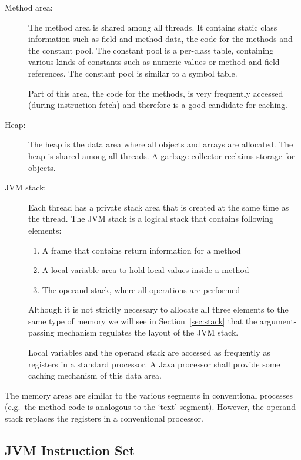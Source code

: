 \begin{description}
    \item[Method area:]
The method area is shared among all threads. It contains static
class information such as field and method data, the code for the
methods and the constant pool. The constant pool is a per-class
table, containing various kinds of constants such as numeric values
or method and field references. The constant pool is similar to a
symbol table.

Part of this area, the code for the methods, is very frequently
accessed (during instruction fetch) and therefore is a good
candidate for caching.

    \item[Heap:]
The heap is the data area where all objects and arrays are
allocated. The heap is shared among all threads. A garbage collector
reclaims storage for objects.

    \item[JVM stack:]
Each thread has a private stack area that is created at the same
time as the thread. The JVM stack is a logical stack that contains
following elements:
\begin{enumerate}
    \item A frame that contains return information for a method
    \item A local variable area to hold local values inside a method
    \item The operand stack, where all operations are performed
\end{enumerate}
%
Although it is not strictly necessary to allocate all three elements
to the same type of memory we will see in Section~\ref{sec:stack}
that the argument-passing mechanism regulates the layout of the JVM
stack.

Local variables and the operand stack are accessed as frequently as
registers in a standard processor. A Java processor shall provide
some caching mechanism of this data area.

\end{description}
%
The memory areas are similar to the various segments in conventional
processes (e.g.\ the method code is analogous to the `text'
segment). However, the operand stack replaces the registers in a
conventional processor.

\subsection{JVM Instruction Set}

